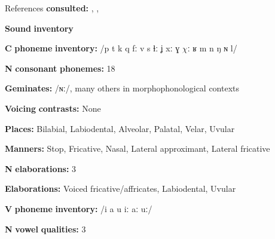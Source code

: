 \begin{styleBody}
References \textbf{consulted:} \citet{Fortescue1984}, \citet{Hagerup2011}, \citet{Jacobsen2000}
\end{styleBody}

\begin{styleBody}
\textbf{Sound} \textbf{inventory}
\end{styleBody}

\begin{styleBody}
\textbf{C} \textbf{phoneme} \textbf{inventory:} /p t k q fː v s ɬː ʝ xː ɣ $\chi ː$ ʁ m n ŋ ɴ l/
\end{styleBody}

\begin{styleBody}
\textbf{N} \textbf{consonant} \textbf{phonemes:} 18
\end{styleBody}

\begin{styleBody}
\textbf{Geminates:} /ɴː/, many others in morphophonological contexts
\end{styleBody}

\begin{styleBody}
\textbf{Voicing} \textbf{contrasts:} None
\end{styleBody}

\begin{styleBody}
\textbf{Places:} Bilabial, Labiodental, Alveolar, Palatal, Velar, Uvular
\end{styleBody}

\begin{styleBody}
\textbf{Manners:} Stop, Fricative, Nasal, Lateral approximant, Lateral fricative 
\end{styleBody}

\begin{styleBody}
\textbf{N} \textbf{elaborations:} 3
\end{styleBody}

\begin{styleBody}
\textbf{Elaborations:} Voiced fricative/affricates, Labiodental, Uvular
\end{styleBody}

\begin{styleBody}
\textbf{V} \textbf{phoneme} \textbf{inventory:} /i a u iː aː uː/
\end{styleBody}

\begin{styleBody}
\textbf{N} \textbf{vowel} \textbf{qualities:} 3
\end{styleBody}

